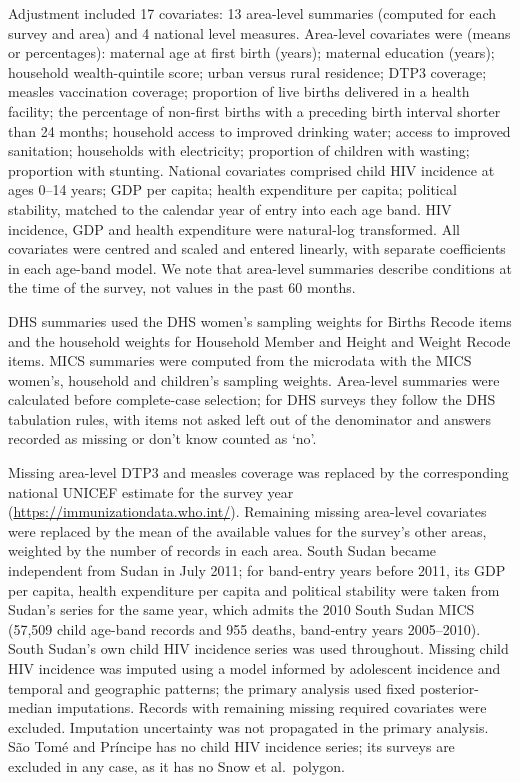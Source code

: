\documentclass[12pt]{article}
\begin{document}
Adjustment included 17 covariates: 13 area-level summaries (computed for each survey and area) and 4 national level measures. Area-level covariates were (means or percentages): maternal age at first birth (years); maternal education (years); household wealth-quintile score; urban versus rural residence; DTP3 coverage; measles vaccination coverage; proportion of live births delivered in a health facility; the percentage of non-first births with a preceding birth interval shorter than 24 months; household access to improved drinking water; access to improved sanitation; households with electricity; proportion of children with wasting; proportion with stunting. National covariates comprised child HIV incidence at ages 0–14 years; GDP per capita; health expenditure per capita; political stability, matched to the calendar year of entry into each age band. HIV incidence, GDP and health expenditure were natural-log transformed. All covariates were centred and scaled and entered linearly, with separate coefficients in each age-band model. We note that area-level summaries describe conditions at the time of the survey, not values in the past 60 months.

DHS summaries used the DHS women's sampling weights for Births Recode items and the household weights for Household Member and Height and Weight Recode items. MICS summaries were computed from the microdata with the MICS women's, household and children's sampling weights. Area-level summaries were calculated before complete-case selection; for DHS surveys they follow the DHS tabulation rules, with items not asked left out of the denominator and answers recorded as missing or don't know counted as `no'.

Missing area-level DTP3 and measles coverage was replaced by the corresponding national UNICEF estimate for the survey year (\url{https://immunizationdata.who.int/}). Remaining missing area-level covariates were replaced by the mean of the available values for the survey's other areas, weighted by the number of records in each area. South Sudan became independent from Sudan in July 2011; for band-entry years before 2011, its GDP per capita, health expenditure per capita and political stability were taken from Sudan's series for the same year, which admits the 2010 South Sudan MICS (57,509 child age-band records and 955 deaths, band-entry years 2005–2010). South Sudan's own child HIV incidence series was used throughout. Missing child HIV incidence was imputed using a model informed by adolescent incidence and temporal and geographic patterns; the primary analysis used fixed posterior-median imputations. Records with remaining missing required covariates were excluded. Imputation uncertainty was not propagated in the primary analysis. São Tomé and Príncipe has no child HIV incidence series; its surveys are excluded in any case, as it has no Snow et al.\ polygon.
\end{document}
